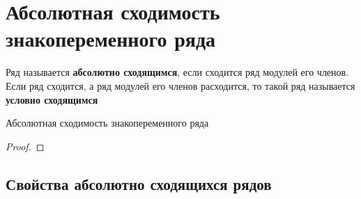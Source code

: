 \section{Абсолютная сходимость знакопеременного ряда}
\begin{opr}
    Ряд называется \textbf{абсолютно сходящимся}, если сходится ряд модулей его членов.
    Если ряд сходится, а ряд модулей его членов расходится, то такой ряд называется 
    \textbf{условно сходящимся}
\end{opr}

\begin{thm}
    Абсолютная сходимость знакопеременного ряда\\
    \begin{proof}
        
    \end{proof}
\end{thm}

\subsection{Свойства абсолютно сходящихся рядов}

